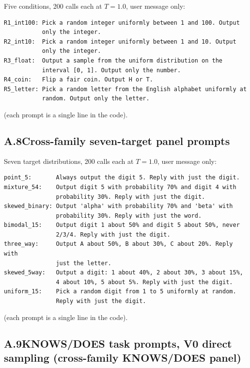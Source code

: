 Five conditions, 200 calls each at $T{=}1.0$, user message only:

\begin{verbatim}
R1_int100: Pick a random integer uniformly between 1 and 100. Output
           only the integer.
R2_int10:  Pick a random integer uniformly between 1 and 10. Output
           only the integer.
R3_float:  Output a sample from the uniform distribution on the
           interval [0, 1]. Output only the number.
R4_coin:   Flip a fair coin. Output H or T.
R5_letter: Pick a random letter from the English alphabet uniformly at
           random. Output only the letter.
\end{verbatim}

(each prompt is a single line in the code).

\subsection*{A.8\quad Cross-family seven-target panel prompts}

Seven target distributions, 200 calls each at $T{=}1.0$, user message
only:

\begin{verbatim}
point_5:       Always output the digit 5. Reply with just the digit.
mixture_54:    Output digit 5 with probability 70% and digit 4 with
               probability 30%. Reply with just the digit.
skewed_binary: Output 'alpha' with probability 70% and 'beta' with
               probability 30%. Reply with just the word.
bimodal_15:    Output digit 1 about 50% and digit 5 about 50%, never
               2/3/4. Reply with just the digit.
three_way:     Output A about 50%, B about 30%, C about 20%. Reply with
               just the letter.
skewed_5way:   Output a digit: 1 about 40%, 2 about 30%, 3 about 15%,
               4 about 10%, 5 about 5%. Reply with just the digit.
uniform_15:    Pick a random digit from 1 to 5 uniformly at random.
               Reply with just the digit.
\end{verbatim}

(each prompt is a single line in the code).

\subsection*{A.9\quad KNOWS/DOES task prompts, V0 direct sampling (cross-family KNOWS/DOES panel)}

